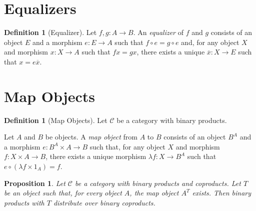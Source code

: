 \documentclass{article}
\newtheorem{proposition}[axiom]{Proposition}
\theoremstyle{definition}
\newtheorem{definition}[axiom]{Definition}
\begin{document}
\section{Equalizers}

\begin{definition}[Equalizer]
    Let $f, g : A \rightarrow B$. An \emph{equalizer} of $f$ and $g$ consists of an object $E$ and a morphism
    $e : E \rightarrow A$ such that $f \circ e = g \circ e$ and, for any object $X$ and morphism $x : X
    \rightarrow A$ such that $fx = gx$, there exists a unique $\overline{x} : X \rightarrow E$ such that
    $x = e \overline{x}$.
\end{definition}

\section{Map Objects}

\begin{definition}[Map Objects]
    Let $\mathcal{C}$ be a category with binary products.

    Let $A$ and $B$ be objects. A \emph{map object} from $A$ to $B$ consists of an object $B^A$ and a morphism
    $e : B^A \times A \rightarrow B$ such that, for any object $X$ and morphism $f : X \times A \rightarrow B$,
    there exists a unique morphism $\lambda f : X \rightarrow B^A$ such that $e \circ (\lambda f \times 1_A)
    = f$.
\end{definition}

\begin{proposition}
    Let $\mathcal{C}$ be a category with binary products and coproducts. Let $T$ be an object such that,
    for every object $A$, the map object $A^T$ exists. Then binary products with $T$ distribute over binary
    coproducts.
\end{proposition}
\end{document}
